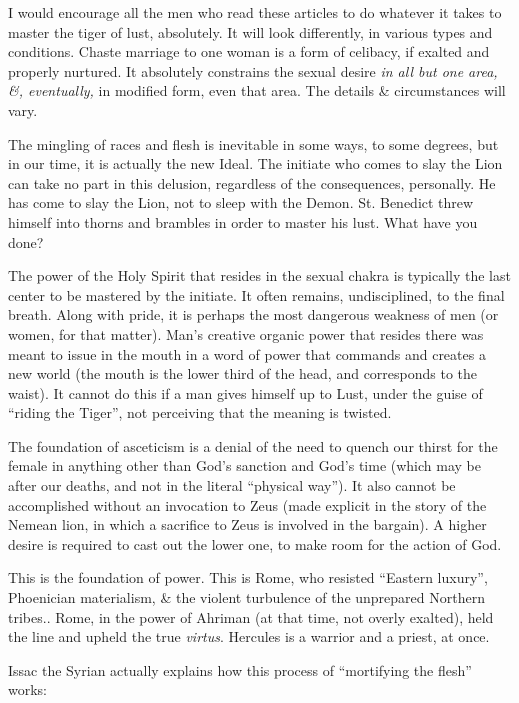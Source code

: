 I would encourage all the men who read these articles to do whatever it takes to master the tiger of lust, absolutely. It will look differently, in various types and conditions. Chaste marriage to one woman is a form of celibacy, if exalted and properly nurtured. It absolutely constrains the sexual desire \emph{in all but one area, \&, eventually,} in modified form, even that area. The details \& circumstances will vary.

The mingling of races and flesh is inevitable in some ways, to some degrees, but in our time, it is actually the new Ideal. The initiate who comes to slay the Lion can take no part in this delusion, regardless of the consequences, personally. He has come to slay the Lion, not to sleep with the Demon. St. Benedict threw himself into thorns and brambles in order to master his lust. What have you done?

The power of the Holy Spirit that resides in the sexual chakra is typically the last center to be mastered by the initiate. It often remains, undisciplined, to the final breath. Along with pride, it is perhaps the most dangerous weakness of men (or women, for that matter). Man's creative organic power that resides there was meant to issue in the mouth in a word of power that commands and creates a new world (the mouth is the lower third of the head, and corresponds to the waist). It cannot do this if a man gives himself up to Lust, under the guise of ``riding the Tiger'', not perceiving that the meaning is twisted.

The foundation of asceticism is a denial of the need to quench our thirst for the female in anything other than God's sanction and God's time (which may be after our deaths, and not in the literal ``physical way''). It also cannot be accomplished without an invocation to Zeus (made explicit in the story of the Nemean lion, in which a sacrifice to Zeus is involved in the bargain). A higher desire is required to cast out the lower one, to make room for the action of God.

This is the foundation of power. This is Rome, who resisted ``Eastern luxury'', Phoenician materialism, \& the violent turbulence of the unprepared Northern tribes.. Rome, in the power of Ahriman (at that time, not overly exalted), held the line and upheld the true
\emph{virtus}. Hercules is a warrior and a priest, at once.


Issac the Syrian actually explains how this process of ``mortifying the flesh'' works:

